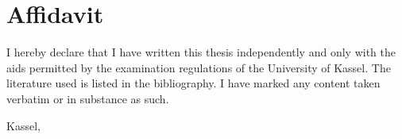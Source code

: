 \setcounter{page}{0}
\chapter*{Affidavit}

I hereby declare that I have written this thesis independently and only with the aids permitted by the examination regulations of the University of Kassel.
The literature used is listed in the bibliography.
I have marked any content taken verbatim or in substance as such.

\vspace{1cm}

Kassel, \thesisdate

\begin{flushright}
  \underline{\hspace{7cm}} \\
  \thesisauthorname

\end{flushright}